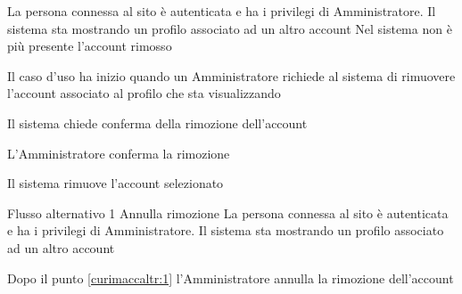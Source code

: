 
{}
{La persona connessa al sito è autenticata e ha i privilegi di Amministratore. Il sistema sta mostrando un profilo associato ad un altro account}
{Nel sistema non è più presente l'account rimosso}
{\begin{enumCU}
	\item Il caso d'uso ha inizio quando un Amministratore richiede al sistema di rimuovere l'account associato al profilo che sta visualizzando
	\item Il sistema chiede conferma della rimozione dell'account\label{curimaccaltr:1}
	\item L'Amministratore conferma la rimozione
	\item Il sistema rimuove l'account selezionato
\end{enumCU}}
%
{Flusso alternativo 1}%
{Annulla rimozione}%
{La persona connessa al sito è autenticata e ha i privilegi di Amministratore. Il sistema sta mostrando un profilo associato ad un altro account}%
{\postNulle}%
{\begin{enumCU}
	\item Dopo il punto \ref{curimaccaltr:1} l'Amministratore annulla la rimozione dell'account
\end{enumCU}}%


